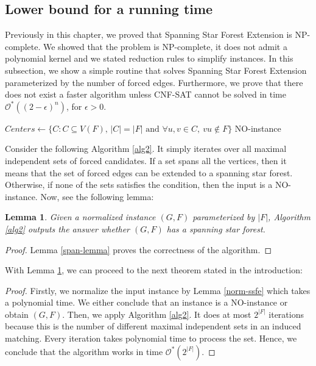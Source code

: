 \documentclass[en]{pracamgr}
\newtheorem{lemma}{Lemma}
\theoremstyle{definition}
\newcommand{\ssf}{spanning star forest}
\newcommand{\ssfep}{{\sc Spanning Star Forest Extension}}
\newcommand{\cnfsat}{{\sc CNF-SAT}}
\begin{document}
\subsection{Lower bound for a running time}

Previously in this chapter, we proved that \ssfep{} is NP-complete. We showed that the problem is NP-complete, it does not admit a polynomial kernel and we stated reduction rules to simplify instances. In this subsection, we show a simple routine that solves \ssfep{} parameterized by the number of forced edges. Furthermore, we prove that there does not exist a faster algorithm unless \cnfsat{} cannot be solved in time $\mathcal{O}^*((2-\epsilon)^n)$, for $\epsilon>0$.

\begin{algorithm}\label{alg2}
	\KwResult{\ssf{} of $G$ extending $F$}
	$Centers \leftarrow \{C: C \subseteq V(F) \text{, }|C|=|F| \text{ and } \forall u,v \in C,\ vu \notin F\}$\;
	\Return NO-instance\;
	\caption{Extending a spanning star forest from a normalized graph.}
\end{algorithm}

Consider the following Algorithm \ref{alg2}. It simply iterates over all maximal independent sets of forced candidates. If a set spans all the vertices, then it means that the set of forced edges can be extended to a spanning star forest. Otherwise, if none of the sets satisfies the condition, then the input is a NO-instance. Now, see the following lemma:

\begin{lemma}\label{alg2-correctness}
	Given a normalized instance $(G,F)$ parameterized by $|F|$, Algorithm \ref{alg2} outputs the answer whether $(G,F)$ has a spanning star forest.
\end{lemma}

\begin{proof}
	Lemma \ref{span-lemma} proves the correctness of the algorithm.
\end{proof}

With Lemma \ref{alg2-correctness}, we can proceed to the next theorem stated in the introduction:

\thmssfepfetime*

\begin{proof}
	Firstly, we normalize the input instance by Lemma \ref{norm-ssfe} which takes a polynomial time. We either conclude that an instance is a NO-instance or obtain $(G,F)$. Then, we apply Algorithm \ref{alg2}. It does at most $2^{|F|}$ iterations because this is the number of different maximal independent sets in an induced matching. Every iteration takes polynomial time to process the set. Hence, we conclude that the algorithm works in time $\mathcal{O}^*(2^{|F|})$.
\end{proof}
\end{document}
